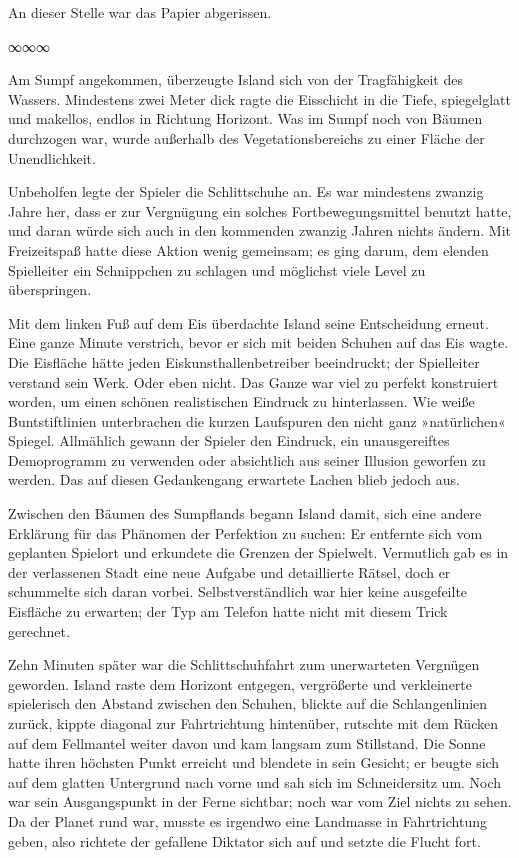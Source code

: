 An dieser Stelle war das Papier abgerissen.

\begin{center}
	∞∞∞
\end{center}

Am Sumpf angekommen, überzeugte Island sich von der Tragfähigkeit des Wassers. Mindestens zwei Meter dick ragte die Eisschicht in die Tiefe, spiegelglatt und makellos, endlos in Richtung Horizont. Was im Sumpf noch von Bäumen durchzogen war, wurde außerhalb des Vegetationsbereichs zu einer Fläche der Unendlichkeit.

Unbeholfen legte der Spieler die Schlittschuhe an. Es war mindestens zwanzig Jahre her, dass er zur Vergnügung ein solches Fortbewegungsmittel benutzt hatte, und daran würde sich auch in den kommenden zwanzig Jahren nichts ändern. Mit Freizeitspaß hatte diese Aktion wenig gemeinsam; es ging darum, dem elenden Spielleiter ein Schnippchen zu schlagen und möglichst viele Level zu überspringen.

Mit dem linken Fuß auf dem Eis überdachte Island seine Entscheidung erneut. Eine ganze Minute verstrich, bevor er sich mit beiden Schuhen auf das Eis wagte. Die Eisfläche hätte jeden Eiskunsthallenbetreiber beeindruckt; der Spielleiter verstand sein Werk. Oder eben nicht. Das Ganze war viel zu perfekt konstruiert worden, um einen schönen realistischen Eindruck zu hinterlassen. Wie weiße Buntstiftlinien unterbrachen die kurzen Laufspuren den nicht ganz »natürlichen« Spiegel. Allmählich gewann der Spieler den Eindruck, ein unausgereiftes Demoprogramm zu verwenden oder absichtlich aus seiner Illusion geworfen zu werden. Das auf diesen Gedankengang erwartete Lachen blieb jedoch aus.

Zwischen den Bäumen des Sumpflands begann Island damit, sich eine andere Erklärung für das Phänomen der Perfektion zu suchen: Er entfernte sich vom geplanten Spielort und erkundete die Grenzen der Spielwelt. Vermutlich gab es in der verlassenen Stadt eine neue Aufgabe und detaillierte Rätsel, doch er schummelte sich daran vorbei. Selbstverständlich war hier keine ausgefeilte Eisfläche zu erwarten; der Typ am Telefon hatte nicht mit diesem Trick gerechnet.

Zehn Minuten später war die Schlittschuhfahrt zum unerwarteten Vergnügen geworden. Island raste dem Horizont entgegen, vergrößerte und verkleinerte spielerisch den Abstand zwischen den Schuhen, blickte auf die Schlangenlinien zurück, kippte diagonal zur Fahrtrichtung hintenüber, rutschte mit dem Rücken auf dem Fellmantel weiter davon und kam langsam zum Stillstand. Die Sonne hatte ihren höchsten Punkt erreicht und blendete in sein Gesicht; er beugte sich auf dem glatten Untergrund nach vorne und sah sich im Schneidersitz um. Noch war sein Ausgangspunkt in der Ferne sichtbar; noch war vom Ziel nichts zu sehen. Da der Planet rund war, musste es irgendwo eine Landmasse in Fahrtrichtung geben, also richtete der gefallene Diktator sich auf und setzte die Flucht fort.

